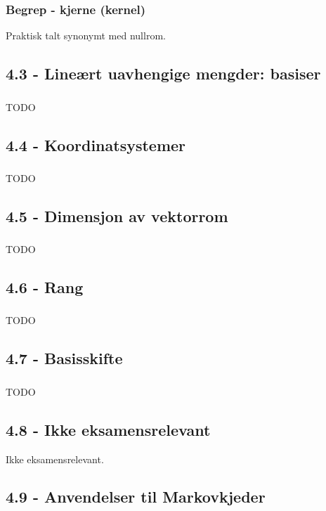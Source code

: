 \documentclass{article}
\begin{document}
      \subsubsection{Begrep - kjerne (kernel)}
        Praktisk talt synonymt med nullrom.
    \subsection{4.3 - Lineært uavhengige mengder: basiser}
      \subsubsection{}
        TODO
    \subsection{4.4 - Koordinatsystemer}
      \subsubsection{}
        TODO
    \subsection{4.5 - Dimensjon av vektorrom}
      \subsubsection{}
        TODO
    \subsection{4.6 - Rang}
      \subsubsection{}
        TODO
    \subsection{4.7 - Basisskifte}
      \subsubsection{}
        TODO
    \subsection{4.8 - Ikke eksamensrelevant}
      Ikke eksamensrelevant.
    \subsection{4.9 - Anvendelser til Markovkjeder}
\end{document}
